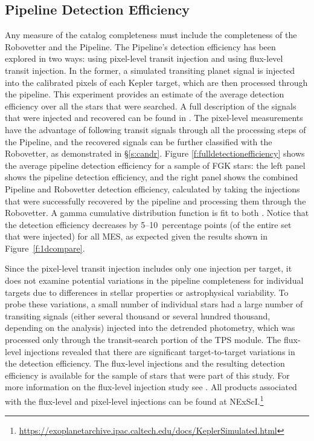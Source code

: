 \subsection{Pipeline Detection Efficiency}

Any measure of the catalog completeness must include the completeness of the Robovetter and the \Kepler{} Pipeline. The Pipeline's detection efficiency has been explored in two ways: using pixel-level transit injection and using flux-level transit injection. In the former, a simulated transiting planet signal is injected into the calibrated pixels of each Kepler target, which are then processed through the pipeline. This experiment provides an estimate of the average detection efficiency over all the stars that were searched. A full description of the signals that were injected and recovered can be found in \citet{Christiansen2017}. The pixel-level measurements have the advantage of following transit signals through all the processing steps of the \Kepler{} Pipeline, and the recovered signals can be further classified with the Robovetter, as demonstrated in \S\ref{s:candr}. Figure \ref{f:fulldetectionefficiency} shows the average pipeline detection efficiency for a sample of FGK stars: the left panel shows the pipeline detection efficiency, and the right panel shows the combined Pipeline and Robovetter detection efficiency, calculated by taking the injections that were successfully recovered by the pipeline and processing them through the Robovetter. A gamma cumulative distribution function is fit to both \citep[see equation 1 of ][]{Christiansen2016}.  Notice that the detection efficiency decreases by 5--10~percentage points (of the entire set that were injected) for all MES, as expected given the results shown in Figure~\ref{f:1dcompare}. 



Since the pixel-level transit injection includes only one injection per target, it does not examine potential variations in the pipeline completeness for individual targets due to differences in stellar properties or astrophysical variability. To probe these variations, a small number of individual stars had a large number of transiting signals (either several thousand or several hundred thousand, depending on the analysis) injected into the detrended photometry, which was processed only through the transit-search portion of the TPS module. The flux-level injections revealed that there are significant target-to-target variations in the detection efficiency. The flux-level injections and the resulting detection efficiency is available for the sample of stars that were part of this study. For more information on the flux-level injection study see \citet{Burke2017c}. All products associated with the flux-level and pixel-level injections can be found at NExScI.\footnote{\url{https://exoplanetarchive.ipac.caltech.edu/docs/KeplerSimulated.html}}


